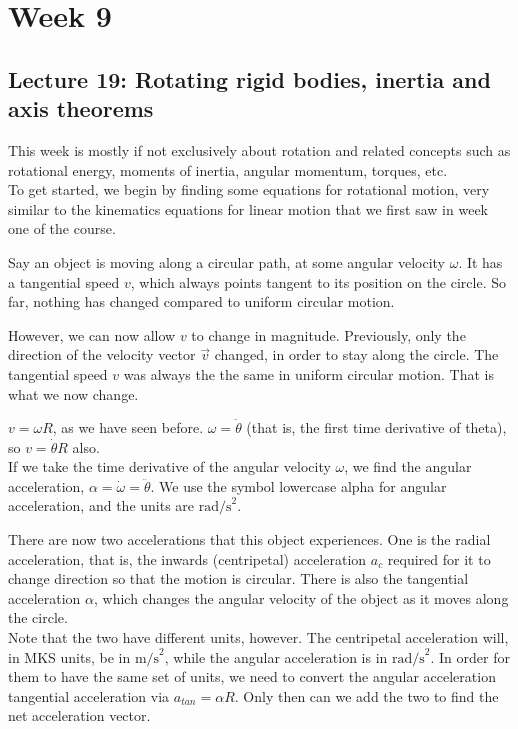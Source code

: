 \documentclass[8.01x]{subfiles}
\begin{document}
\chapter{Week 9}

\section{Lecture 19: Rotating rigid bodies, inertia and axis theorems}

This week is mostly if not exclusively about rotation and related concepts such as rotational energy, moments of inertia, angular momentum, torques, etc.\\
To get started, we begin by finding some equations for rotational motion, very similar to the kinematics equations for linear motion that we first saw in week one of the course.

Say an object is moving along a circular path, at some angular velocity $\omega$. It has a tangential speed $v$, which always points tangent to its position on the circle. So far, nothing has changed compared to uniform circular motion.

However, we can now allow $v$ to change in magnitude. Previously, only the direction of the velocity vector $\vec{v}$ changed, in order to stay along the circle. The tangential speed $v$ was always the the same in uniform circular motion. That is what we now change.

$v = \omega R$, as we have seen before. $\omega = \dot{\theta}$ (that is, the first time derivative of theta), so $v = \dot{\theta} R$ also.\\
If we take the time derivative of the angular velocity $\omega$, we find the angular acceleration, $\alpha = \dot{\omega} = \ddot{\theta}$. We use the symbol lowercase alpha for angular acceleration, and the units are $\text{rad/s}^2$.

There are now two accelerations that this object experiences. One is the radial acceleration, that is, the inwards (centripetal) acceleration $a_c$ required for it to change direction so that the motion is circular. There is also the tangential acceleration $\alpha$, which changes the angular velocity of the object as it moves along the circle.\\
Note that the two have different units, however. The centripetal acceleration will, in MKS units, be in $\text{m/s}^2$, while the angular acceleration is in $\text{rad/s}^2$. In order for them to have the same set of units, we need to convert the angular acceleration tangential acceleration via $a_{tan} = \alpha R$. Only then can we add the two to find the net acceleration vector.
\end{document}
